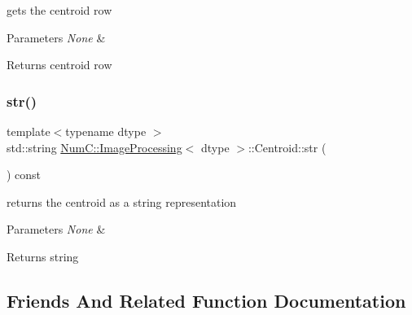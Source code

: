 gets the centroid row


\begin{DoxyParams}{Parameters}
{\em None} & \\
\hline
\end{DoxyParams}
\begin{DoxyReturn}{Returns}
centroid row 
\end{DoxyReturn}
\mbox{\label{class_num_c_1_1_image_processing_1_1_centroid_a2fbcff50f43883bd28a65ef9fdfbe4fa}} 
\subsubsection{\texorpdfstring{str()}{str()}}
{\footnotesize\ttfamily template$<$typename dtype $>$ \\
std\+::string \mbox{\hyperlink{class_num_c_1_1_image_processing}{Num\+C\+::\+Image\+Processing}}$<$ dtype $>$\+::Centroid\+::str (\begin{DoxyParamCaption}{ }\end{DoxyParamCaption}) const\hspace{0.3cm}{\ttfamily [inline]}}

returns the centroid as a string representation


\begin{DoxyParams}{Parameters}
{\em None} & \\
\hline
\end{DoxyParams}
\begin{DoxyReturn}{Returns}
string 
\end{DoxyReturn}


\subsection{Friends And Related Function Documentation}
\mbox{\label{class_num_c_1_1_image_processing_1_1_centroid_a5313d8a6a2d6a5fde55a8457650c54d3}} 
